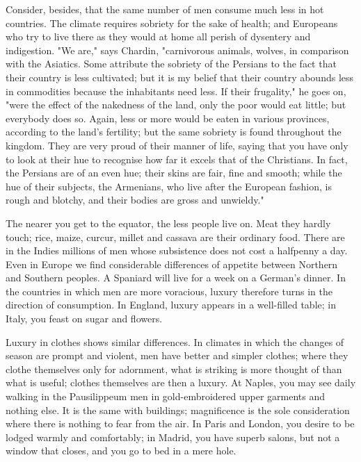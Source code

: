 \documentclass[12pt]{book}
\begin{document}
Consider, besides, that the same number of men consume much less in hot countries. The climate requires sobriety for the sake of health; and Europeans who try to live there as they would at home all perish of dysentery and indigestion. "We are," says Chardin, "carnivorous animals, wolves, in comparison with the Asiatics. Some attribute the sobriety of the Persians to the fact that their country is less cultivated; but it is my belief that their country abounds less in commodities because the inhabitants need less. If their frugality," he goes on, "were the effect of the nakedness of the land, only the poor would eat little; but everybody does so. Again, less or more would be eaten in various provinces, according to the land's fertility; but the same sobriety is found throughout the kingdom. They are very proud of their manner of life, saying that you have only to look at their hue to recognise how far it excels that of the Christians. In fact, the Persians are of an even hue; their skins are fair, fine and smooth; while the hue of their subjects, the Armenians, who live after the European fashion, is rough and blotchy, and their bodies are gross and unwieldy."

The nearer you get to the equator, the less people live on. Meat they hardly touch; rice, maize, curcur, millet and cassava are their ordinary food. There are in the Indies millions of men whose subsistence does not cost a halfpenny a day. Even in Europe we find considerable differences of appetite between Northern and Southern peoples. A Spaniard will live for a week on a German's dinner. In the countries in which men are more voracious, luxury therefore turns in the direction of consumption. In England, luxury appears in a well-filled table; in Italy, you feast on sugar and flowers.

Luxury in clothes shows similar differences. In climates in which the changes of season are prompt and violent, men have better and simpler clothes; where they clothe themselves only for adornment, what is striking is more thought of than what is useful; clothes themselves are then a luxury. At Naples, you may see daily walking in the Pausilippeum men in gold-embroidered upper garments and nothing else. It is the same with buildings; magnificence is the sole consideration where there is nothing to fear from the air. In Paris and London, you desire to be lodged warmly and comfortably; in Madrid, you have superb salons, but not a window that closes, and you go to bed in a mere hole.
\end{document}
